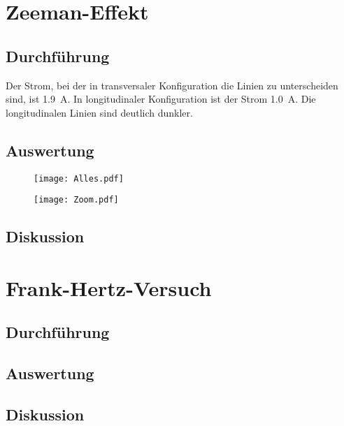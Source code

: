 \chapter{Zeeman-Effekt}

\section{Durchführung}

Der Strom, bei der in transversaler Konfiguration die Linien zu unterscheiden
sind, ist \SI{1.9}{\ampere}. In longitudinaler Konfiguration ist der Strom
\SI{1.0}{\ampere}. Die longitudinalen Linien sind deutlich dunkler.

\section{Auswertung}

\begin{figure}[htbp]
    \centering
    \texttt{[image: Alles.pdf]}
    \caption{%
    }
    \label{fig:}
\end{figure}

\begin{figure}[htbp]
    \centering
    \texttt{[image: Zoom.pdf]}
    \caption{%
    }
    \label{fig:}
\end{figure}

\section{Diskussion}

\chapter{Frank-Hertz-Versuch}

\section{Durchführung}

\section{Auswertung}

\section{Diskussion}

\printbibliography



